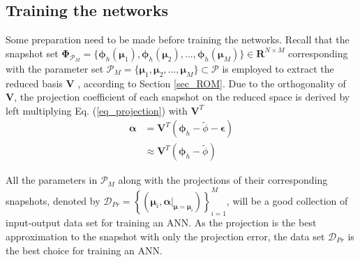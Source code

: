 \documentclass[preprint, 10pt]{elsarticle}
\begin{document}
\subsection{Training the networks}

Some preparation need to be made before training the networks. Recall that the snapshot set $\pmb {\Phi}_{\mathcal{P}_M}=\{\pmb{\phi}_h(\pmb{\mu}_1), \pmb{\phi}_h(\pmb{\mu}_2),...,\pmb{\phi}_h(\pmb{\mu}_M)\}  \in \mathbf{R}^{N \times M}$ corresponding with the parameter set $\mathcal{P}_M=\{\pmb{\mu}_1, \pmb{\mu}_2,...,\pmb{\mu}_M\} \subset \mathcal{P}$ is employed to extract the reduced basis $\mathbf{V}$ , according to Section \ref{sec_ROM}. Due to the orthogonality of $\mathbf{V}$, the projection coefficient of each snapshot on the reduced space is derived by left multiplying Eq. (\ref{eq_projection}) with $\mathbf{V}^T$
\begin{equation}
\begin{aligned}
\pmb{\alpha}  &   =    \mathbf{V}^T (\pmb{\phi}_h -\tilde{\phi} - \pmb{\epsilon}) \\
              &\approx \mathbf{V}^T (\pmb{\phi}_h -\tilde{\phi})
\end{aligned}
\label{eq_RBCoefficients}
\end{equation}

All the parameters in $\mathcal{P}_M$ along with the projections of their corresponding snapshots, denoted by $\mathcal{D}_{Pr}=\left\{\left(\pmb{\mu}_i, \left. {\pmb{\alpha}} \right|_{\pmb{\mu}=\pmb{\mu}_i}
\right) \right\}_{i=1}^{M}$,  will be a good collection of input-output data set for training an ANN. As the projection is the best approximation to the snapshot with only the projection error, the data set $\mathcal{D}_{Pr}$ is the best choice for training an ANN.
\end{document}
